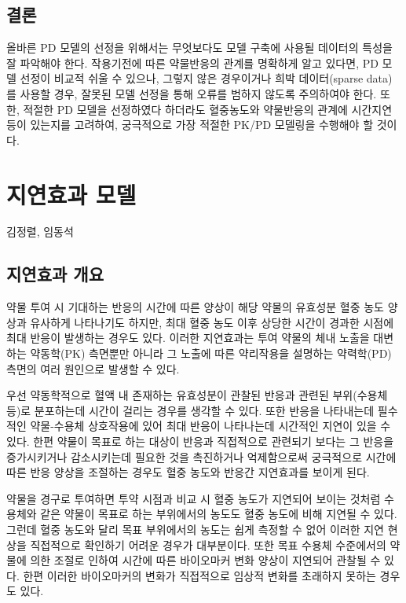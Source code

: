 \documentclass[
  11pt,
  krantz2, a4paper, twoside]{krantz}
\theoremstyle{definition}
\theoremstyle{definition}
\theoremstyle{definition}
\theoremstyle{remark}
\begin{document}
\hypertarget{uxacb0uxb860}{%
\section{결론}\label{uxacb0uxb860}}

올바른 PD 모델의 선정을 위해서는 무엇보다도 모델 구축에 사용될 데이터의 특성을 잘 파악해야 한다. 작용기전에 따른 약물반응의 관계를 명확하게 알고 있다면, PD 모델 선정이 비교적 쉬울 수 있으나, 그렇지 않은 경우이거나 희박 데이터(sparse data)를 사용할 경우, 잘못된 모델 선정을 통해 오류를 범하지 않도록 주의하여야 한다. 또한, 적절한 PD 모델을 선정하였다 하더라도 혈중농도와 약물반응의 관계에 시간지연 등이 있는지를 고려하여, 궁극적으로 가장 적절한 PK/PD 모델링을 수행해야 할 것이다.

\hypertarget{delayed-effect}{%
\chapter{지연효과 모델}\label{delayed-effect}}

\Large\hfill

김정렬, 임동석
\normalsize

\hypertarget{uxc9c0uxc5f0uxd6a8uxacfc-uxac1cuxc694}{%
\section{지연효과 개요}\label{uxc9c0uxc5f0uxd6a8uxacfc-uxac1cuxc694}}

약물 투여 시 기대하는 반응의 시간에 따른 양상이 해당 약물의 유효성분 혈중 농도 양상과 유사하게 나타나기도 하지만, 최대 혈중 농도 이후 상당한 시간이 경과한 시점에 최대 반응이 발생하는 경우도 있다. 이러한 지연효과는 투여 약물의 체내 노출을 대변하는 약동학(PK) 측면뿐만 아니라 그 노출에 따른 약리작용을 설명하는 약력학(PD) 측면의 여러 원인으로 발생할 수 있다.

우선 약동학적으로 혈액 내 존재하는 유효성분이 관찰된 반응과 관련된 부위(수용체 등)로 분포하는데 시간이 걸리는 경우를 생각할 수 있다. 또한 반응을 나타내는데 필수적인 약물-수용체 상호작용에 있어 최대 반응이 나타나는데 시간적인 지연이 있을 수 있다. 한편 약물이 목표로 하는 대상이 반응과 직접적으로 관련되기 보다는 그 반응을 증가시키거나 감소시키는데 필요한 것을 촉진하거나 억제함으로써 궁극적으로 시간에 따른 반응 양상을 조절하는 경우도 혈중 농도와 반응간 지연효과를 보이게 된다.

약물을 경구로 투여하면 투약 시점과 비교 시 혈중 농도가 지연되어 보이는 것처럼 수용체와 같은 약물이 목표로 하는 부위에서의 농도도 혈중 농도에 비해 지연될 수 있다. 그런데 혈중 농도와 달리 목표 부위에서의 농도는 쉽게 측정할 수 없어 이러한 지연 현상을 직접적으로 확인하기 어려운 경우가 대부분이다. 또한 목표 수용체 수준에서의 약물에 의한 조절로 인하여 시간에 따른 바이오마커 변화 양상이 지연되어 관찰될 수 있다. 한편 이러한 바이오마커의 변화가 직접적으로 임상적 변화를 초래하지 못하는 경우도 있다.
\end{document}
